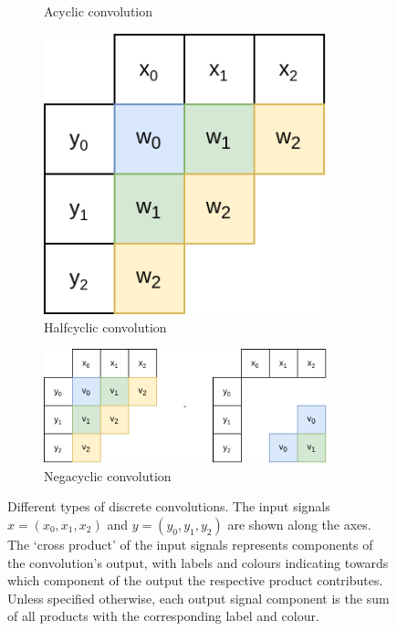 \begin{figure}
\begin{subfigure}{.33\textwidth}
				\caption{Acyclic convolution}
				\label{fig:acyclic_convolution}
		\end{subfigure}%
		\begin{subfigure}{.33\textwidth}
				\centering
				\includegraphics[width=0.9\textwidth]{../resources/halfcyclic_convolution.drawio.png}
				\caption{Halfcyclic convolution}
				\label{fig:halfcyclic_convolution}
		\end{subfigure}
		\begin{subfigure}{.66\textwidth}
				\centering
				\includegraphics[width=0.9\textwidth]{../resources/negacyclic_convolution.drawio.png}
				\caption{Negacyclic convolution}
				\label{fig:negacyclic_convolution}
		\end{subfigure}
		\caption{
				Different types of discrete convolutions. The input signals $x
				= (x_0, x_1, x_2)$ and $y = (y_0, y_1, y_2)$ are shown along
				the axes. The `cross product' of the input signals represents
				components of the convolution's output, with  labels and
				colours indicating towards which component of the output the
				respective product contributes.  Unless specified otherwise,
				each output signal component is the sum of all products with
				the corresponding label and colour.
}
\end{figure}

